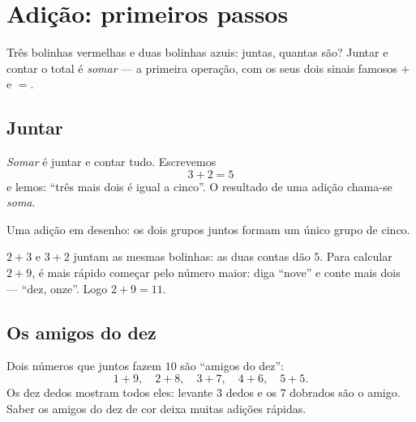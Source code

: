 \chapter{Adição: primeiros passos}\label{ch:g1:addition}

Três bolinhas vermelhas e duas bolinhas azuis: juntas, quantas são?
Juntar e contar o total é \emph{somar} --- a primeira operação, com
os seus dois sinais famosos $+$ e $=$.

\section{Juntar}

\begin{definition}[Adição]\label{def:g1:addition:def}
\emph{Somar} é juntar e contar tudo. Escrevemos
\[
3 + 2 = 5
\]
e lemos: ``três mais dois é igual a cinco''. O resultado de uma
adição chama-se \emph{soma}.
\end{definition}

\begin{omfigure}

{\small Uma adição em desenho: os dois grupos juntos formam um único
grupo de cinco.}
\end{omfigure}

\begin{example}\label{ex:g1:addition:order}
$2 + 3$ e $3 + 2$ juntam as mesmas bolinhas: as duas contas dão $5$.
Para calcular $2 + 9$, é mais rápido começar pelo número maior: diga
``nove'' e conte mais dois --- ``dez, onze''. Logo $2 + 9 = 11$.
\end{example}

\section{Os amigos do dez}

\begin{example}\label{ex:g1:addition:friends}
Dois números que juntos fazem $10$ são ``amigos do dez'':
\[
1 + 9, \quad 2 + 8, \quad 3 + 7, \quad 4 + 6, \quad 5 + 5 .
\]
Os dez dedos mostram todos eles: levante $3$ dedos e os $7$ dobrados
são o amigo. Saber os amigos do dez de cor deixa muitas adições
rápidas.
\end{example}

